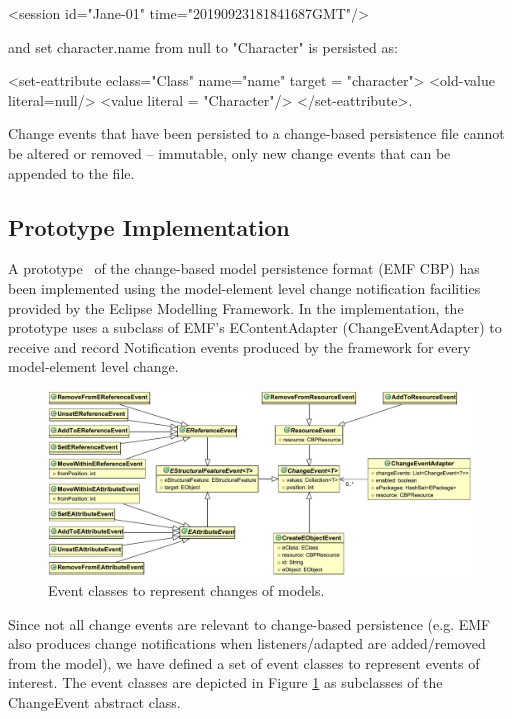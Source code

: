 \textsf{<session id="Jane-01" time="20190923181841687GMT"/>} 

and \textsf{set character.name from null to "Character"} is persisted as:

\textsf{<set-eattribute eclass="Class" name="name" 
target = "character">
<old-value literal=null/>
<value literal = "Character"/>
</set-eattribute>}.

Change events that have been persisted to a change-based persistence file cannot be altered or removed – immutable,  only new change events that can be appended to the file.

\subsection{Prototype Implementation}
\label{sec:prototype_implementation}

A prototype~\cite{epsilonlabs2019emfcbp} of the change-based model persistence format (EMF CBP) has been implemented using the model-element level change notification facilities provided by the Eclipse Modelling Framework. In the implementation, the prototype uses a subclass of EMF's \textsf{EContentAdapter} (\textsf{ChangeEventAdapter}) to receive and record \textsf{Notification} events produced by the framework for every model-element level change.

\begin{figure}[th]
\centering
\includegraphics[width=\linewidth]{events}
\caption{Event classes to represent changes of models.}
\label{fig:events}
\end{figure}

Since not all change events are relevant to change-based persistence (e.g. EMF also produces change notifications when listeners/adapted are added/removed from the model), we have defined a set of event classes to represent events of interest. The event classes are depicted in Figure \ref{fig:events} as subclasses of the \textsf{ChangeEvent} abstract class.

